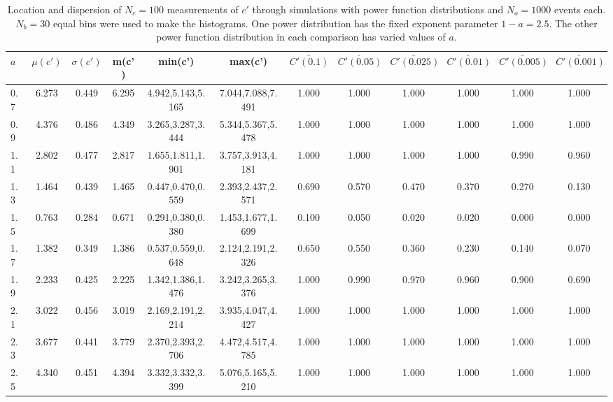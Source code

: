 \begin{table*}[h]
\begin{center}
\begin{tabular}{| l | c | c | c | c | c | c | c | c | c | c | c |}\hline
$a$ & $\mu(c')$ & $\sigma(c')$ & m(c') & min(c') & max(c') & $\overline{C'(0.1)}$ & $\overline{C'(0.05)}$ & $\overline{C'(0.025)}$ & $\overline{C'(0.01)}$ & $\overline{C'(0.005)}$ & $\overline{C'(0.001)}$ \\\hline
0.7 & 6.273 & 0.449 & 6.295 & 4.942,5.143,5.165 & 7.044,7.088,7.491  & 1.000  & 1.000  & 1.000  & 1.000  & 1.000  & 1.000 \\\hline
0.9 & 4.376 & 0.486 & 4.349 & 3.265,3.287,3.444 & 5.344,5.367,5.478  & 1.000  & 1.000  & 1.000  & 1.000  & 1.000  & 1.000 \\\hline
1.1 & 2.802 & 0.477 & 2.817 & 1.655,1.811,1.901 & 3.757,3.913,4.181  & 1.000  & 1.000  & 1.000  & 1.000  & 0.990  & 0.960 \\\hline
1.3 & 1.464 & 0.439 & 1.465 & 0.447,0.470,0.559 & 2.393,2.437,2.571  & 0.690  & 0.570  & 0.470  & 0.370  & 0.270  & 0.130 \\\hline
1.5 & 0.763 & 0.284 & 0.671 & 0.291,0.380,0.380 & 1.453,1.677,1.699  & 0.100  & 0.050  & 0.020  & 0.020  & 0.000  & 0.000 \\\hline
1.7 & 1.382 & 0.349 & 1.386 & 0.537,0.559,0.648 & 2.124,2.191,2.326  & 0.650  & 0.550  & 0.360  & 0.230  & 0.140  & 0.070 \\\hline
1.9 & 2.233 & 0.425 & 2.225 & 1.342,1.386,1.476 & 3.242,3.265,3.376  & 1.000  & 0.990  & 0.970  & 0.960  & 0.900  & 0.690 \\\hline
2.1 & 3.022 & 0.456 & 3.019 & 2.169,2.191,2.214 & 3.935,4.047,4.427  & 1.000  & 1.000  & 1.000  & 1.000  & 1.000  & 1.000 \\\hline
2.3 & 3.677 & 0.441 & 3.779 & 2.370,2.393,2.706 & 4.472,4.517,4.785  & 1.000  & 1.000  & 1.000  & 1.000  & 1.000  & 1.000 \\\hline
2.5 & 4.340 & 0.451 & 4.394 & 3.332,3.332,3.399 & 5.076,5.165,5.210  & 1.000  & 1.000  & 1.000  & 1.000  & 1.000  & 1.000 \\\hline
\end{tabular}
\caption{Location and dispersion of $N_c=100$
measurements of $c'$ through simulations
with power function distributions and $N_o=1000$ events each.
$N_b=30$ equal bins were used to make the histograms.
One power distribution has the fixed exponent parameter $1-a=2.5$.
The other power function distribution in each comparison
has varied values of $a$.}
\end{center}
\end{table*}

